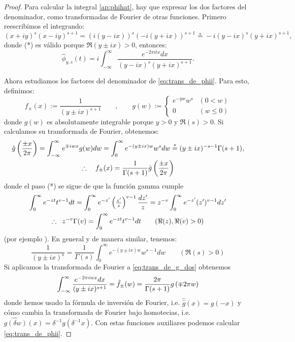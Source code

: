 \documentclass[../../tesis_maestria]{subfiles}
\begin{document}
\begin{proof}
  Para calcular la integral \eqref{ap:phihat}, hay que
  expresar los dos factores del denominador, como transformadas de Fourier de otras funciones. Primero
  reescribimos el integrando:
\[
  (x+iy)^s(x-iy)^{s+1}=
  (i(y-ix))^s(-i(y+ix))^{s+1}\overset{*}{=}
  -i(y-ix)^s(y+ix)^{s+1},
\]
donde (*) es v\'alido porque $\Re(y\pm ix)>0$, entonces:
\begin{equation}\label{eq:trans_de_phii}
  \hat{\phi}_{y,s}(t)=
  i\int_{-\infty}^{\infty}\frac{e^{-2\pi itx}dx}{(y-ix)^s(y+ix)^{s+1}}.
\end{equation}

Ahora estudiamos los factores del denominador de \eqref{eq:trans_de_phii}. Para esto, definimos:
\[
  f_{\pm}(x):=\frac{1}{(y\pm ix)^{s+1}} \qquad,\qquad
  g(w):=
  \begin{cases}
    e^{-yw}w^s &(0<w)\\
    0 &(w\leq 0)
  \end{cases}
\]
donde $g(w)$ es absolutamente integrable porque $y>0$ y $\Re(s)>0$. Si calculamos su transformada de
Fourier, obtenemos:
\begin{gather}
  \hat{g}\left( \frac{\pm x}{2\pi} \right)=
  \int_{-\infty}^{\infty}e^{\mp iwx}g(w)dw=
  \int_0^{\infty}e^{-(y\pm ix)w}w^sdw\overset{*}{=}
  (y\pm ix)^{-s-1}\Gamma(s+1),\nonumber\\
  \therefore \quad f_{\pm}(x)=\frac{1}{\Gamma(s+1)} \hat{g}\left( \frac{\pm x}{2\pi} \right)
  \label{eq:trans_de_g_dos}
\end{gather}
donde el paso (*) se sigue de que la funci\'on gamma cumple
\begin{gather}
  \int_0^{\infty}e^{-zt}t^{v-1}dt=
  \int_0^{\infty}e^{-z'}\left( \tfrac{z'}{z} \right)^{v-1}\frac{dz'}{z}=
  z^{-v}\int_0^{\infty}e^{-z'}(z')^{v-1}dz'\nonumber\\
  \therefore\;\;z^{-v}\Gamma(v) = \int_0^{\infty}e^{-zt}t^{v-1}dt
  \qquad(\Re(z),\Re(v)>0)\label{eq:prop_gamma}
\end{gather}
(por ejemplo \cite[\S5.2.5]{AhlforsCA}). En general y de manera similar, tenemos:
\begin{equation}\label{eq:denominador}
  \frac{1}{(y\pm ix)^s}=
  \frac{1}{\Gamma(s)}\int_0^{\infty}e^{-(y\pm ix)w}w^{s-1}dw\qquad(\Re(s)>0)
\end{equation}
Si aplicamos la transformada de Fourier a \eqref{eq:trans_de_g_dos} obtenemos
\begin{equation}\label{eq:trans_de_f}
  \int_{-\infty}^{\infty}\frac{e^{-2\pi iwx}dx}{(y\pm ix)^{s+1}}=\hat{f}_{\pm}(w)=
  \frac{2\pi}{\Gamma(s+1)}g\left( \mp 2\pi w \right)
\end{equation}
donde hemos usado la f\'ormula de inversi\'on de Fourier, i.e. $\hat{\hat{g}}(x)=g(-x)$ y c\'omo
cambia la transformada de Fourier bajo homotecias, i.e.
$\widehat{g(\delta w)}(x)=\delta^{-1}g(\delta^{-1}x)$. Con estas funciones auxiliares podemos
calcular \eqref{eq:trans_de_phii}.


\end{proof}
\end{document}
